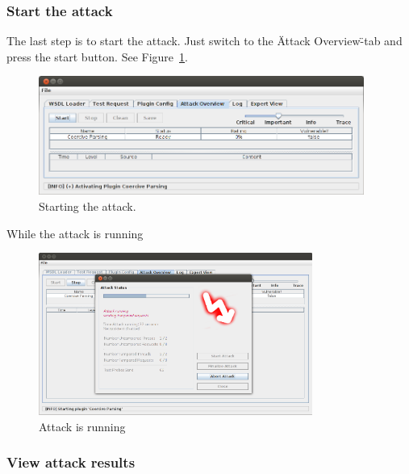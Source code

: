 \subsubsection{Start the attack}
\label{sec:starting_the_attacks_dos}

The last step is to start the attack. 
Just switch to the \"Attack Overview\"-tab and press the start button. See Figure~\ref{fig:dosStep4}.

\begin{figure}[H]
    \begin{center}
        \includegraphics[width=0.95\textwidth]{img/dosStep4.png}
    \end{center}
    \caption{Starting the attack.}
    \label{fig:dosStep4}
\end{figure}

While the attack is running
\begin{figure}[H]
    \begin{center}
        \includegraphics[width=0.8\textwidth]{img/dosStep4_1.png}
    \end{center}
    \caption{Attack is running}
    \label{fig:dosStep4_1}
\end{figure}


\subsubsection{View attack results}
\label{sec:view_results}

